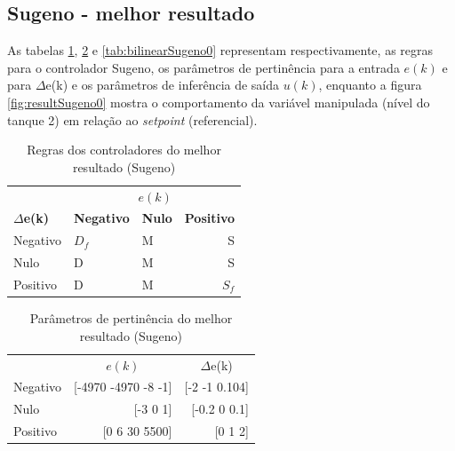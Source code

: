 \documentclass[
	twoside,				%
	twocolumn,				%
	english,				%
	brazil,					%
]{article}
\begin{document}

\subsection{Sugeno - melhor resultado}

As tabelas \ref{tab:rulesSugeno0}, \ref{tab:pertinenceSugeno0} e \ref{tab:bilinearSugeno0} representam respectivamente, as regras para o controlador Sugeno, os parâmetros de pertinência para a entrada $e(k)$ e para $\Delta$e(k) e os parâmetros de inferência de saída $u(k)$, enquanto a figura \ref{fig:resultSugeno0} mostra o comportamento da variável manipulada (nível do tanque 2) em relação ao \textit{setpoint} (referencial).


\begin{table}[!h]
\caption{Regras dos controladores do melhor resultado (Sugeno)}
\label{tab:rulesSugeno0}
\centering
\begin{tabular}{lllr}
\toprule
\multicolumn{3}{r}{\textbf{$e(k)$}} \\
\cmidrule(r){2-4}
\textbf{$\Delta$e(k)} & \textbf{Negativo} & \textbf{Nulo} & \textbf{Positivo} \\
Negativo & $D_f$ & M & S \\
Nulo & D & M & S \\
Positivo & D & M & $S_f$ \\
\bottomrule
\end{tabular}
\end{table}


\begin{table}[!h]
\caption{Parâmetros de pertinência do melhor resultado (Sugeno)}
\label{tab:pertinenceSugeno0}
\centering
\begin{tabular}{lrr}
\toprule
& \multicolumn{1}{c}{$e(k)$} & \multicolumn{1}{c}{$\Delta$e(k)} \\
\cmidrule(r){1-3}
Negativo & [-4970 -4970 -8 -1] & [-2 -1 0.104] \\
Nulo & [-3 0 1] & [-0.2 0 0.1] \\
Positivo & [0 6 30 5500] & [0 1 2] \\
\bottomrule
\end{tabular}
\end{table}

\end{document}
